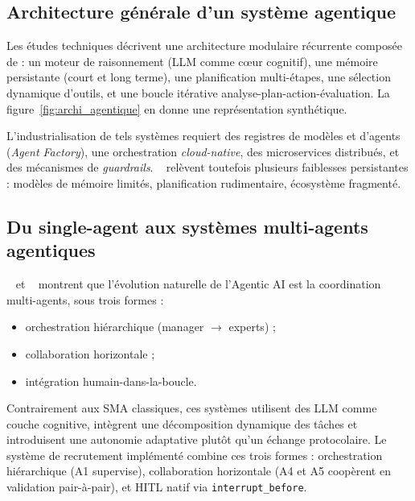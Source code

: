 \subsection{Architecture générale d'un système agentique}

Les études techniques \cite{agentic_wavestone_playbook,alva_pandey,vaidhyanathan_taibi} décrivent une architecture modulaire récurrente composée de : un moteur de raisonnement (LLM comme cœur cognitif), une mémoire persistante (court et long terme), une planification multi-étapes, une sélection dynamique d'outils, et une boucle itérative analyse-plan-action-évaluation. La figure~\ref{fig:archi_agentique} en donne une représentation synthétique.



L'industrialisation de tels systèmes requiert des registres de modèles et d'agents (\emph{Agent Factory}), une orchestration \emph{cloud-native}, des microservices distribués, et des mécanismes de \emph{guardrails}. \citeauthor{vaidhyanathan_taibi}~\cite{vaidhyanathan_taibi} relèvent toutefois plusieurs faiblesses persistantes : modèles de mémoire limités, planification rudimentaire, écosystème fragmenté.

\subsection{Du single-agent aux systèmes multi-agents agentiques}

\citeauthor{milosevic_rabhi}~\cite{milosevic_rabhi} et \citeauthor{hughes2025}~\cite{hughes2025} montrent que l'évolution naturelle de l'Agentic AI est la coordination multi-agents, sous trois formes :

\begin{itemize}[leftmargin=1cm]
\item orchestration hiérarchique (manager $\rightarrow$ experts) ;
\item collaboration horizontale ;
\item intégration humain-dans-la-boucle.
\end{itemize}

Contrairement aux SMA classiques, ces systèmes utilisent des LLM comme couche cognitive, intègrent une décomposition dynamique des tâches et introduisent une autonomie adaptative plutôt qu'un échange protocolaire. Le système de recrutement implémenté combine ces trois formes : orchestration hiérarchique (A1 supervise), collaboration horizontale (A4 et A5 coopèrent en validation pair-à-pair), et HITL natif via \texttt{interrupt\_before}.

